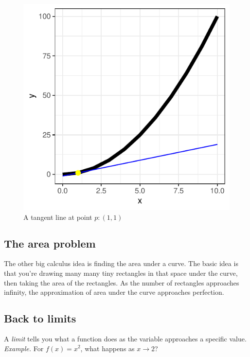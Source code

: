 \documentclass{article}
\begin{document}
\begin{figure}[H]
    \centering
    \includegraphics{tangent.pdf}
    \caption{A tangent line at point $p: (1, 1)$}
    \label{fig:tangent}
\end{figure}

\subsection{The area problem}

The other big calculus idea is finding the area under a curve. The basic idea is that
you're drawing many many tiny rectangles in that space under the curve, then taking the
area of the rectangles. As the number of rectangles approaches infinity, the approximation
of area under the curve approaches perfection.

\subsection{Back to limits}

A \emph{limit} tells you what a function does as the variable approaches a specific
value.\\

\emph{Example.} For $f(x) = x^2$, what happens as $x \rightarrow 2$?\\
\end{document}
